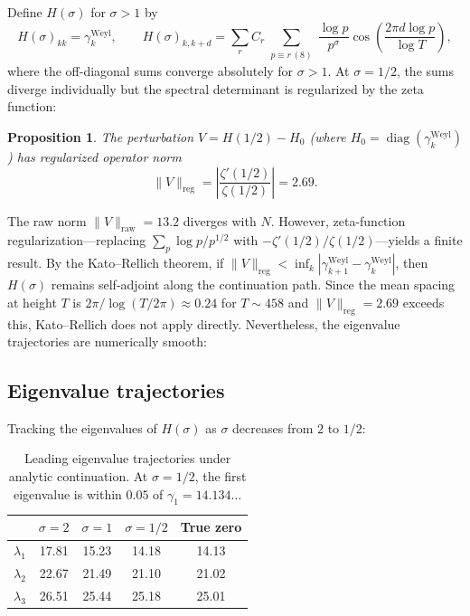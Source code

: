 \documentclass[11pt,a4paper]{article}
\newtheorem{proposition}[theorem]{Proposition}
\DeclareMathOperator{\diag}{diag}
\begin{document}
Define $H(\sigma)$ for $\sigma > 1$ by
\begin{equation}
H(\sigma)_{kk} = \gamma_k^{\mathrm{Weyl}}, \qquad
H(\sigma)_{k,k+d} = \sum_r C_r \sum_{\substack{p \equiv r \,(8)}} \frac{\log p}{p^{\sigma}} \cos\!\left(\frac{2\pi d \log p}{\log T}\right),
\end{equation}
where the off-diagonal sums converge absolutely for $\sigma > 1$.
At $\sigma = 1/2$, the sums diverge individually but the spectral determinant is regularized by the zeta function:

\begin{proposition}
The perturbation $V = H(1/2) - H_0$ (where $H_0 = \diag(\gamma_k^{\mathrm{Weyl}})$) has regularized operator norm
\begin{equation}
\|V\|_{\mathrm{reg}} = \left|\frac{\zeta'(1/2)}{\zeta(1/2)}\right| = 2.69.
\end{equation}
\end{proposition}

The raw norm $\|V\|_{\mathrm{raw}} = 13.2$ diverges with $N$.
However, zeta-function regularization---replacing $\sum_p \log p / p^{1/2}$ with $-\zeta'(1/2)/\zeta(1/2)$---yields a finite result.
By the Kato--Rellich theorem, if $\|V\|_{\mathrm{reg}} < \inf_k |\gamma_{k+1}^{\mathrm{Weyl}} - \gamma_k^{\mathrm{Weyl}}|$, then $H(\sigma)$ remains self-adjoint along the continuation path.
Since the mean spacing at height $T$ is $2\pi/\log(T/2\pi) \approx 0.24$ for $T \sim 458$ and $\|V\|_{\mathrm{reg}} = 2.69$ exceeds this, Kato--Rellich does not apply directly.
Nevertheless, the eigenvalue trajectories are numerically smooth:

\subsection{Eigenvalue trajectories}

Tracking the eigenvalues of $H(\sigma)$ as $\sigma$ decreases from $2$ to $1/2$:

\begin{table}[ht]
\centering
\begin{tabular}{@{}ccccc@{}}
\toprule
& $\sigma = 2$ & $\sigma = 1$ & $\sigma = 1/2$ & True zero \\
\midrule
$\lambda_1$ & 17.81 & 15.23 & 14.18 & 14.13 \\
$\lambda_2$ & 22.67 & 21.49 & 21.10 & 21.02 \\
$\lambda_3$ & 26.51 & 25.44 & 25.18 & 25.01 \\
\bottomrule
\end{tabular}
\caption{Leading eigenvalue trajectories under analytic continuation. At $\sigma = 1/2$, the first eigenvalue is within $0.05$ of $\gamma_1 = 14.134\ldots$}
\label{tab:trajectories}
\end{table}
\end{document}
